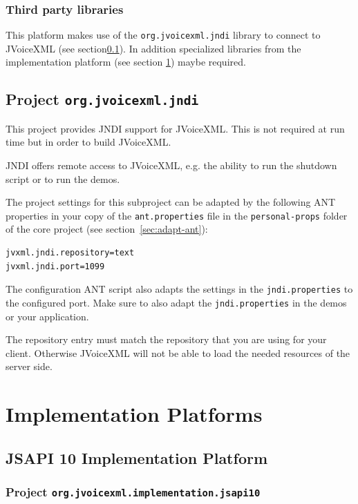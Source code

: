 \documentclass[11pt,a4paper]{article}
\begin{document}
\subsubsection{Third party libraries}

This platform makes use of the \lstinline{org.jvoicexml.jndi} library
to connect to JVoiceXML (see section\ref{sec:jndi}). In addition specialized
libraries from the implementation platform (see section
\ref{sec:implementation-platforms}) maybe required.

\subsection{Project \texttt{org.jvoicexml.jndi}}
\label{sec:jndi}

This project provides JNDI support for JVoiceXML. This is not required at run
time but in order to build JVoiceXML.

JNDI offers remote access to JVoiceXML, e.g. the ability to run the
shutdown script or to run the demos.

The project settings for this subproject can be adapted by the following ANT
properties in your copy of the \texttt{ant.properties} file in the
\texttt{personal-props} folder of the core project (see 
section~\ref{sec:adapt-ant}):
\begin{lstlisting}
jvxml.jndi.repository=text
jvxml.jndi.port=1099
\end{lstlisting}

The configuration ANT script also adapts the settings in the
\texttt{jndi.properties} to the configured port. Make sure to also adapt
the \texttt{jndi.properties} in the demos or your application.

The repository entry must match the repository that you are using for your
client. Otherwise JVoiceXML will not be able to load the needed resources of
the server side.

\section{Implementation Platforms}
\label{sec:implementation-platforms}

\subsection{JSAPI 10 Implementation Platform}
\label{sec:implementation-jsapi10}

\subsubsection{Project \texttt{org.jvoicexml.implementation.jsapi10}}
\end{document}
